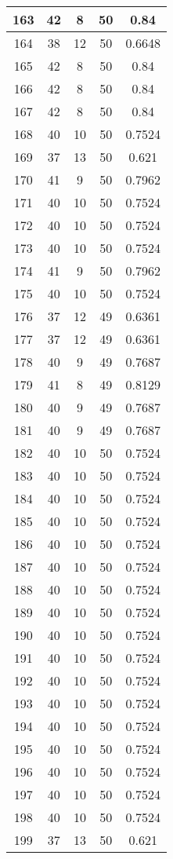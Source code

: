 \documentclass[letterpaper, 12pt]{article}
\begin{document}
\begin{longtable}{|c|c|c|c|c|}
\hline
163 & 42 & 8 & 50 & 0.84 \\
\hline
164 & 38 & 12 & 50 & 0.6648 \\
\hline
165 & 42 & 8 & 50 & 0.84 \\
\hline
166 & 42 & 8 & 50 & 0.84 \\
\hline
167 & 42 & 8 & 50 & 0.84 \\
\hline
168 & 40 & 10 & 50 & 0.7524 \\
\hline
169 & 37 & 13 & 50 & 0.621 \\
\hline
170 & 41 & 9 & 50 & 0.7962 \\
\hline
171 & 40 & 10 & 50 & 0.7524 \\
\hline
172 & 40 & 10 & 50 & 0.7524 \\
\hline
173 & 40 & 10 & 50 & 0.7524 \\
\hline
174 & 41 & 9 & 50 & 0.7962 \\
\hline
175 & 40 & 10 & 50 & 0.7524 \\
\hline
176 & 37 & 12 & 49 & 0.6361 \\
\hline
177 & 37 & 12 & 49 & 0.6361 \\
\hline
178 & 40 & 9 & 49 & 0.7687 \\
\hline
179 & 41 & 8 & 49 & 0.8129 \\
\hline
180 & 40 & 9 & 49 & 0.7687 \\
\hline
181 & 40 & 9 & 49 & 0.7687 \\
\hline
182 & 40 & 10 & 50 & 0.7524 \\
\hline
183 & 40 & 10 & 50 & 0.7524 \\
\hline
184 & 40 & 10 & 50 & 0.7524 \\
\hline
185 & 40 & 10 & 50 & 0.7524 \\
\hline
186 & 40 & 10 & 50 & 0.7524 \\
\hline
187 & 40 & 10 & 50 & 0.7524 \\
\hline
188 & 40 & 10 & 50 & 0.7524 \\
\hline
189 & 40 & 10 & 50 & 0.7524 \\
\hline
190 & 40 & 10 & 50 & 0.7524 \\
\hline
191 & 40 & 10 & 50 & 0.7524 \\
\hline
192 & 40 & 10 & 50 & 0.7524 \\
\hline
193 & 40 & 10 & 50 & 0.7524 \\
\hline
194 & 40 & 10 & 50 & 0.7524 \\
\hline
195 & 40 & 10 & 50 & 0.7524 \\
\hline
196 & 40 & 10 & 50 & 0.7524 \\
\hline
197 & 40 & 10 & 50 & 0.7524 \\
\hline
198 & 40 & 10 & 50 & 0.7524 \\
\hline
199 & 37 & 13 & 50 & 0.621 \\
\hline
\end{longtable}
\end{document}
